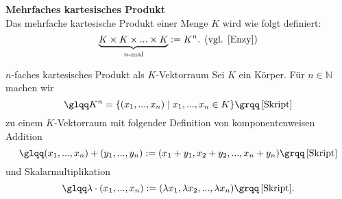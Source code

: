 \theoremstyle{definition}
\begin{definition}{\textbf{Mehrfaches kartesisches Produkt}}
\label{exampleVR}
	\\Das mehrfache kartesische Produkt einer Menge $K$ wird wie folgt definiert:
\[\underbrace{K \times K \times ... \times K}_{n\text{-mal}} := K^n \text{. (vgl. \cite[S. 28]{Enzy})}\]
\end{definition}

\theoremstyle{example}
\begin{example}{$n$-faches kartesisches Produkt als $K$-Vektorraum}
Sei $K$ ein Körper. Für $n \in \mathbb{N}$ machen wir \[\text{{\glqq}} K^n = \{(x_1,...,x_n) \mid x_1,...,x_n \in K\} \text{{\grqq}} \, \text{\cite[S. 28, 6.2]{Skript}}\]zu einem $K$-Vektorraum mit folgender Definition von komponentenweisen Addition
\[\text{{\glqq}}(x_1,...,x_n)+(y_1,...,y_n) := (x_1 + y_1,x_2 + y_2,..., x_n + y_n)\text{{\grqq}}\, \text{\cite[S. 28, 6.2]{Skript}}\]
und Skalarmultiplikation
\[\text{{\glqq}}\lambda \cdot (x_1,...,x_n):= (\lambda x_1,\lambda x_2,...,\lambda x_n)\text{{\grqq}} \, \text{\cite[S. 28, 6.2]{Skript}.}\]
\end{example}

